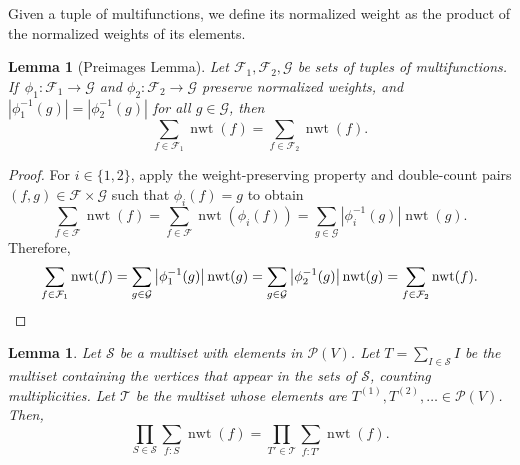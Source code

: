 \documentclass[11pt]{article}
\newtheorem{lemm}[theo]{Lemma}
\theoremstyle{definition}
\numberwithin{equation}{section}
\newcommand{\mtp}[1]{^{(#1)}} \newcommand{\graph}{\varGamma}
\newcommand{\vertices}{V}
\newcommand{\powerset}[1]{\mathcal{P}(#1)}
\DeclareMathOperator{\normalizedweight}{nwt}
\begin{document}
Given a tuple of multifunctions, we define its normalized weight as the product of the normalized weights of its elements.

\begin{lemm}[Preimages Lemma] \label{lemma:preimage}
    Let \(\mathcal{F}_1, \mathcal{F}_2, \mathcal{G}\) be sets of tuples of multifunctions.
    If~\(\phi_1 \colon \mathcal{F}_1 \to \mathcal{G}\) and
    \(\phi_2 \colon \mathcal{F}_2 \to \mathcal{G}\) preserve normalized weights, and
    \( |\phi_1^{-1}(g)| = |\phi_2^{-1}(g)| \) for all \(g \in \mathcal{G}\), then
    \begin{equation*}
        \sum_{f \in \mathcal{F}_1} \normalizedweight(f) = \sum_{f \in \mathcal{F}_2} \normalizedweight(f).
    \end{equation*} 
\end{lemm}

\begin{proof}
    For \(i \in \{1, 2\}\), apply the weight-preserving property and double-count pairs \((f, g) \in \mathcal{F} \times \mathcal{G}\) such that \(\phi_i(f) = g\) to obtain
    \begin{equation*}
        \sum_{f \in \mathcal{F}} \normalizedweight(f) =
        \sum_{f \in \mathcal{F}} \normalizedweight(\phi_i(f)) =
        \sum_{g \in \mathcal{G}} \left| \phi_i^{-1}(g) \right| \normalizedweight(g).
    \end{equation*} 
    Therefore,
    \begin{equation*}
        \sum_{f \in \mathcal{F}_1} \normalizedweight(f) =
        \sum_{g \in \mathcal{G}} \left| \phi_1^{-1}(g) \right| \normalizedweight(g) = 
        \sum_{g \in \mathcal{G}} \left| \phi_2^{-1}(g) \right| \normalizedweight(g) = 
        \sum_{f \in \mathcal{F}_2} \normalizedweight(f). \qedhere
    \end{equation*} 
\end{proof}

\begin{lemm} \label{lemma:multiset:decomposition}
    Let \(\mathcal{S}\) be a multiset with elements in \(\powerset{\vertices}\).
    Let \(T = \sum_{I \in \mathcal{S}} I\) be the multiset containing the vertices that appear in the sets of \(\mathcal{S}\), counting multiplicities.
    Let \(\mathcal{T}\) be the multiset whose elements are \(T\mtp{1}, T\mtp{2}, \dots \in \powerset{\vertices}\).
    Then,
    \begin{equation*} \label{eq:multiset:decomposition:nwt}
        \prod_{S \in \mathcal{S}} \sum_{f : S} \normalizedweight(f) = \prod_{T' \in \mathcal{T}} \sum_{f : T'} \normalizedweight(f).
    \end{equation*}
\end{lemm}
\end{document}
